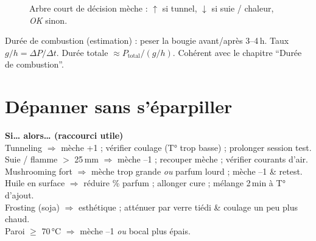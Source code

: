 \documentclass[../../main.tex]{subfiles}
\begin{document}
\begin{figure}[!h]
  \centering
  \caption{Arbre court de décision mèche : \(\uparrow\) si tunnel, \(\downarrow\) si suie / chaleur, \textit{OK} sinon.}
\end{figure}

\begin{remark}
Durée de combustion (estimation) : peser la bougie avant/après 3--4\,h. Taux \(g/h = \Delta P/\Delta t\). Durée totale \(\approx P_{\text{total}} / (g/h)\). Cohérent avec le chapitre ``Durée de combustion''.
\end{remark}

\section{Dépanner sans s’éparpiller}

\begin{BlocDepannage}
\textbf{Si… alors… (raccourci utile)} \\
Tunneling \(\Rightarrow\) mèche +1 ; vérifier coulage (T° trop basse) ; prolonger session test. \\
Suie / flamme \(\!>\) 25\,mm \(\Rightarrow\) mèche --1 ; recouper mèche ; vérifier courants d’air. \\
Mushrooming fort \(\Rightarrow\) mèche trop grande \textit{ou} parfum lourd ; mèche --1 \& retest. \\
Huile en surface \(\Rightarrow\) réduire \% parfum ; allonger cure ; mélange 2\,min à T° d’ajout. \\
Frosting (soja) \(\Rightarrow\) esthétique ; atténuer par verre tiédi \& coulage un peu plus chaud. \\
Paroi \(\geq\) 70\,\si{\celsius} \(\Rightarrow\) mèche --1 \textit{ou} bocal plus épais.
\end{BlocDepannage}
\end{document}
